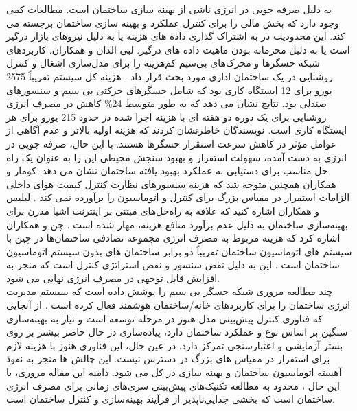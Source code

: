       به دلیل صرفه جویی در انرژی ناشی از بهینه سازی ساختمان است. مطالعات کمی وجود دارد که بخش مالی را برای کنترل عملکرد و بهینه سازی ساختمان 
     برجسته می کند. این محدودیت در به اشتراک گذاری داده های هزینه یا به دلیل 
     نیروهای بازار درگیر است یا به دلیل محرمانه بودن ماهیت داده های درگیر. لبی الدان 
     و همکاران. کاربردهای شبکه حسگرها و محرک‌های بی‌سیم کم‌هزینه را برای مدل‌سازی اشغال و کنترل روشنایی در یک ساختمان
      اداری مورد بحث قرار داد \cite{labeodan2016application}. هزینه کل سیستم تقریباً 2575 یورو برای 12 ایستگاه کاری بود که
      شامل حسگرهای حرکتی بی سیم و سنسورهای صندلی بود. نتایج نشان می دهد که به طور متوسط 24\% کاهش در مصرف انرژی روشنایی برای یک دوره
      دو هفته ای با هزینه اجرا شده در حدود 215 یورو برای هر ایستگاه کاری است. نویسندگان خاطرنشان کردند که هزینه اولیه بالاتر و عدم آگاهی از عوامل مؤثر
      در کاهش سرعت استقرار حسگرها هستند. با این حال، صرفه جویی در انرژی به دست آمده، سهولت استقرار و بهبود سنجش محیطی این
      را به عنوان یک راه حل مناسب برای دستیابی به عملکرد بهبود 
      یافته ساختمان نشان می دهد. کومار و همکاران همچنین متوجه شد که هزینه سنسورهای نظارت کنترل کیفیت هوای داخلی الزامات استقرار در مقیاس بزرگ برای کنترل و اتوماسیون را
       برآورده نمی کند \cite{kumar2016real}. لیلیس و همکاران اشاره کنید
       که علاقه به راه‌حل‌های 
      مبتنی بر اینترنت اشیا مدرن برای بهینه‌سازی ساختمان به دلیل عدم برآورد منافع هزینه، مهار شده است \cite{lilis2017towards}. چن و همکاران اشاره کرد
       که هزینه مربوط به مصرف انرژی مجموعه تصادفی ساختمان‌ها در چین با سیستم های اتوماسیون ساختمان تقریباً دو برابر ساختمان های
       بدون سیستم اتوماسیون ساختمان است \cite{chen2016cost}. این به دلیل نقص سنسور و نقص استراتژی کنترل است که منجر به افزایش قابل توجهی در مصرف انرژی نهایی می شود.
        \\
        چند مطالعه مروری شبکه حسگر بی سیم را پوشش داده است که سیستم مدیریت انرژی ساختمان را برای کاربردهای خانه/ساختمان 
        هوشمند فعال کرده است \cite{kazmi2014review,kuzlu2015review}. از آنجایی که فناوری کنترل پیش‌بینی مدل هنوز در مرحله توسعه است و 
        نیاز به بهینه‌سازی سنگین بر اساس نوع و عملکرد ساختمان دارد،
         پیاده‌سازی در حال حاضر بیشتر بر روی بستر آزمایشی و اعتبارسنجی تمرکز دارد. در عین حال، این فناوری هنوز
         با هزینه لازم برای استقرار در مقیاس های بزرگ در دسترس نیست. 
         این چالش ها منجر به نفوذ آهسته اتوماسیون ساختمان و بهینه سازی در کل می شود. دامنه این مقاله مروری، با این حال
        ، محدود به مطالعه تکنیک‌های پیش‌بینی سری‌های زمانی برای مصرف انرژی ساختمان است که بخشی جدایی‌ناپذیر
         از فرآیند بهینه‌سازی و کنترل ساختمان است.
